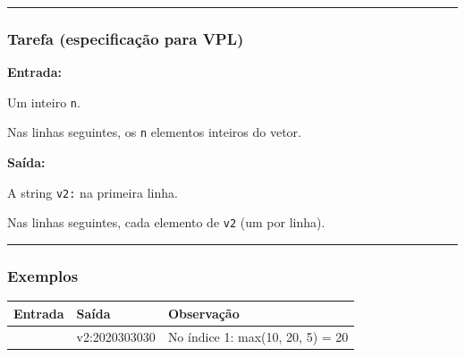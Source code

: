\documentclass[
  portuguese,
  letterpaper,
  openany,
  oneside,
  12pt,
  a4paper]{book}
\begin{document}
\begin{tcolorbox}
\begin{center}\rule{0.5\linewidth}{0.5pt}\end{center}

\subsubsection{\texorpdfstring{ Tarefa (especificação
para
VPL)}{ Tarefa (especificação para VPL)}}\label{tarefa-especificauxe7uxe3o-para-vpl-8}

\textbf{Entrada:}

Um inteiro \texttt{n}.

Nas linhas seguintes, os \texttt{n} elementos inteiros do vetor.

\textbf{Saída:}

A string \texttt{v2:} na primeira linha.

Nas linhas seguintes, cada elemento de \texttt{v2} (um por linha).

\begin{center}\rule{0.5\linewidth}{0.5pt}\end{center}

\subsubsection{\texorpdfstring{
Exemplos}{ Exemplos}}\label{exemplos-8}

\begin{longtable}[]{@{}
  >{\raggedright\arraybackslash}p{}
  >{\raggedright\arraybackslash}p{}
  >{\raggedright\arraybackslash}p{}@{}}
\toprule\noalign{}
\begin{minipage}[b]{\linewidth}\raggedright
Entrada
\end{minipage} & \begin{minipage}[b]{\linewidth}\raggedright
Saída
\end{minipage} & \begin{minipage}[b]{\linewidth}\raggedright
Observação
\end{minipage} \\
\midrule\noalign{}
\endhead
\bottomrule\noalign{}
\endlastfoot
5102053015 & v2:2020303030 & No índice 1: max(10, 20, 5) = 20 \\
\end{longtable}

\begin{figure}[H]


\end{figure}
\end{tcolorbox}
\end{document}
